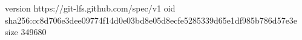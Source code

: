 version https://git-lfs.github.com/spec/v1
oid sha256:cc8d706e3dee09774f14d0e03bd8e05d8ecfe5285339d65e1df985b786d57e3e
size 349680
